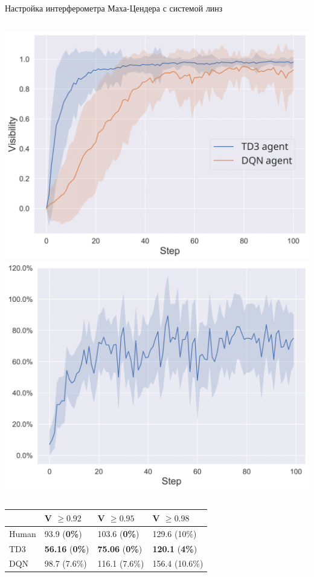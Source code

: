 \begin{frame}[allowframebreaks]{Настройка интерферометра Маха-Цендера с системой линз}
\begin{columns}
\centering
\includegraphics[width=1\linewidth]{Presentation/images/DQN_vs_TD3.png}
\centering
\includegraphics[width=1\linewidth]{Presentation/images/parallel_actions.png}
\end{columns}
\begin{table} [htbp]
    \centering
    \begin{threeparttable}
        \begin{tabular}{| p{2cm} || p{2cm} || p{2cm} || p{3cm} |}
            \hline
            \hline
            &V $\ge 0.92$ & V $\ge 0.95$ & V $\ge 0.98$ \\
            \hline
            Human &  93.9 (\textbf{0\%})  & 103.6 (\textbf{0\%}) & 129.6 (10\%)\\
            TD3 &  \textbf{56.16} (\textbf{0\%}) & \textbf{75.06} (\textbf{0\%}) & \textbf{120.1} (\textbf{4\%})\\
            DQN &  98.7 (7.6\%) & 116.1 (7.6\%) & 156.4 (10.6\%)\\
            \hline
            \hline
        \end{tabular}
    \end{threeparttable}
\end{table}


\end{frame}

